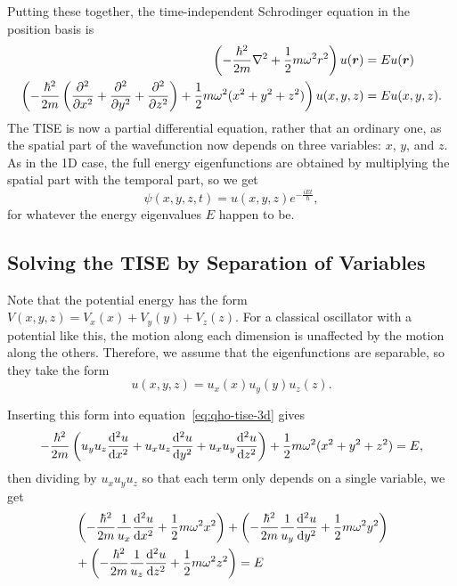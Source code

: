 \documentclass[../quantum_mechanics.tex]{subfiles}
\begin{document}
            Putting these together, the time-independent Schrodinger equation in the position basis is
            \begin{align}
                \left(-\frac{\hbar^2}{2m}\nabla^2+\frac{1}{2}m\omega^2r^2\right)u(\vec{r})&=Eu(\vec{r})\\
                \left(-\frac{\hbar^2}{2m}\left(\pdv[2]{}{x}+\pdv[2]{}{y}+\pdv[2]{}{z}\right)+\frac{1}{2}m\omega^2(x^2+y^2+z^2)\right)u(x,y,z)&=Eu(x,y,z).\label{eq:qho-tise-3d}
            \end{align}
            The TISE is now a partial differential equation, rather that an ordinary one, as the spatial part of the wavefunction now depends on three variables: $x$, $y$, and $z$.
            As in the 1D case, the full energy eigenfunctions are obtained by multiplying the spatial part with the temporal part, so we get
            \begin{equation}
                \psi(x,y,z,t)=u(x,y,z)e^{-\frac{iEt}{\hbar}},
            \end{equation}
            for whatever the energy eigenvalues $E$ happen to be.

        \subsection{Solving the TISE by Separation of Variables}\label{sec:the-3d-quantum-harmonic-oscillator:subsec:solving-the-tise-by-separation-of-variables}
            Note that the potential energy has the form $V(x,y,z)=V_x(x)+V_y(y)+V_z(z)$.
            For a classical oscillator with a potential like this, the motion along each dimension is unaffected by the motion along the others.
            Therefore, we assume that the eigenfunctions are separable, so they take the form
            \begin{equation}
                u(x,y,z)=u_x(x)u_y(y)u_z(z).
            \end{equation}
            
            Inserting this form into equation~\ref{eq:qho-tise-3d} gives
            \begin{equation}
                -\frac{\hbar^2}{2m}\left(u_yu_z\dv[2]{u}{x}+u_xu_z\dv[2]{u}{y}+u_xu_y\dv[2]{u}{z}\right)+\frac{1}{2}m\omega^2(x^2+y^2+z^2)=E,
            \end{equation}
            then dividing by $u_xu_yu_z$ so that each term only depends on a single variable, we get
            \begin{equation}\label{eq:qho-tise-3d-separated}
                \begin{split}
                &\left(-\frac{\hbar^2}{2m}\frac{1}{u_x}\dv[2]{u}{x}+\frac{1}{2}m\omega^2x^2\right)+\left(-\frac{\hbar^2}{2m}\frac{1}{u_y}\dv[2]{u}{y}+\frac{1}{2}m\omega^2y^2\right)\\
                &+\left(-\frac{\hbar^2}{2m}\frac{1}{u_z}\dv[2]{u}{z}+\frac{1}{2}m\omega^2z^2\right)=E 
                \end{split}
            \end{equation}
\end{document}

